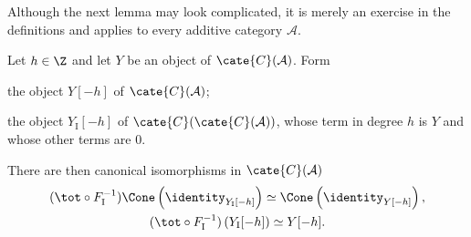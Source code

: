 Although the next lemma may look complicated, it is merely an exercise in the
definitions and applies to every additive category $\mathcal{A}$.

\begin{lemma}\label{prop:double-cplx-tot-aux0}
	Let $h\in\Z$ and let $Y$ be an object of $\cate{C}(\mathcal{A})$. Form
	\begin{compactitem}
		\item the object $Y[-h]$ of $\cate{C}(\mathcal{A})$;
		\item the object $Y_{\mathrm{I}}[-h]$ of
		$\cate{C}(\cate{C}(\mathcal{A}))$, whose term in degree $h$ is $Y$
		and whose other terms are $0$.
	\end{compactitem}
	There are then canonical isomorphisms in $\cate{C}(\mathcal{A})$
	\begin{gather*}
		(\tot \circ F_{\mathrm{I}}^{-1}) \Cone\left( \identity_{Y_{\mathrm{I}}[-h]} \right) \simeq \Cone\left( \identity_{Y[-h]} \right), \\
		(\tot \circ F_{\mathrm{I}}^{-1}) \left( Y_{\mathrm{I}}[-h] \right) \simeq Y[-h].
	\end{gather*}
\end{lemma}
